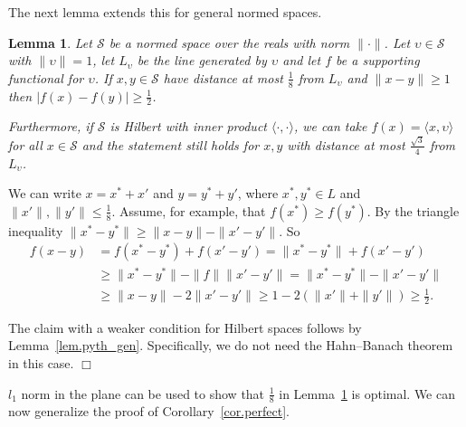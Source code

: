 \documentclass{article}
\newenvironment{proof}{\noindent{\bf Proof}}{\hspace*{\fill}$\Box$}
\newtheorem{lemma} [theorem] {Lemma}\newtheorem{attempt} [theorem] {Attempt}\newtheorem{corollary} [theorem] {Corollary}\newtheorem{prop} [theorem] {Proposition}\newtheorem{definition} [theorem] {Definition}\newtheorem{remark} [theorem] {Remark}\newtheorem{conjecture} [theorem] {Conjecture}\newtheorem{claim} [theorem] {Claim}
\begin{document}
\medskip

The next lemma extends this for general normed spaces.

\begin{lemma} \label{lem.supporting_norms}
    Let $\mathcal{S}$ be a normed space over the reals with norm $\|\cdot\|$.
    Let $\upsilon \in \mathcal{S}$ with $\|\upsilon\|=1$, let $L_\upsilon$ be the line generated by $\upsilon$ and let $f$ be 
a
    supporting functional for $\upsilon$. If $x,y \in \mathcal{S}$ have distance at most $\frac 1 8$ from $L_\upsilon$ and $\|x - y\| \ge 1$ then $|f(x) - f(y)| \ge \frac 1 2$.

    Furthermore, if $\mathcal{S}$ is Hilbert with inner product $\langle \cdot, \cdot \rangle$, we can take $f(x) = \langle x, \upsilon \rangle$ for all $x \in \mathcal{S}$ and the statement still holds for $x,y$ with distance at most $\frac {\sqrt 3} 4$ from $L_\upsilon$.
\end{lemma}

\begin{proof}
    We can write $x = x^* + x'$ and $y=y^* + y'$, where $x^*,y^* \in L$ and $\|x'\|,\|y'\| \le \frac 1 8$. Assume, for example, that $f(x^*) \ge f(y^*)$.
    By the triangle inequality $\|x^* - y^*\| \ge \|x-y\| - \|x' - y'\|$. So
    \begin{align*}
         f(x-y) &= f(x^*-y^*) + f(x' - y') = \|x^* - y^*\| + f(x'-y') 
\\
   & \ge \|x^* - y^*\| - \|f\|\|x' - y'\| = \|x^* - y^*\| - \|x' - y'\|
        \\
        & \ge \|x-y\| - 2\|x'-y'\| \ge 1 - 2(\|x'\|+\|y'\|) \ge \frac 1 2.
    \end{align*}

    The claim with a weaker condition for Hilbert spaces follows by Lemma~\ref{lem.pyth_gen}. Specifically, we do not need the Hahn--Banach theorem in this case. 
\end{proof}

\medskip

$l_1$ norm in the plane can be used to show that $\frac 1 8$ in Lemma~\ref{lem.supporting_norms} is optimal. 
We can now generalize the proof of Corollary~\ref{cor.perfect}.

\medskip
\end{document}
